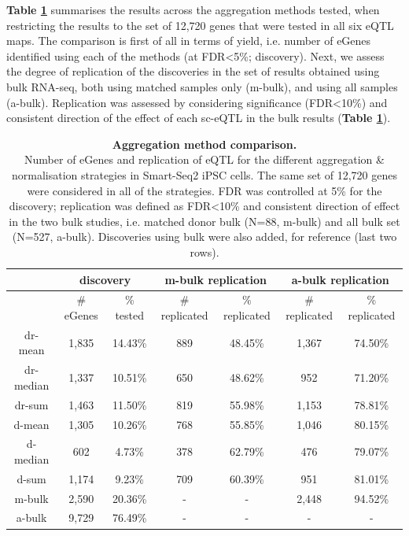 \textbf{Table \ref{tab:egenes}} summarises the results across the aggregation methods tested, when restricting the results to the set of 12,720 genes that were tested in all six eQTL maps.
The comparison is first of all in terms of yield, i.e. number of eGenes identified using each of the methods (at FDR<5\%; discovery).
Next, we assess the degree of replication of the discoveries in the set of results obtained using bulk RNA-seq, both using matched samples only (m-bulk), and using all samples (a-bulk).
Replication was assessed by considering significance (FDR<10\%) and consistent direction of the effect of each sc-eQTL in the bulk results (\textbf{Table \ref{tab:egenes}}).\\

\begin{table}[h]
    \centering
    \begin{tabular}{c|c c|c c|c c}
    & \multicolumn{2}{c}{discovery}&\multicolumn{2}{c}{m-bulk replication} &\multicolumn{2}{c}{a-bulk replication}\\
    \hline
    & \# eGenes & \% tested & \# replicated & \% replicated & \# replicated & \% replicated \\
    \hline
    dr-mean   &  1,835 & 14.43\% & 889 & 48.45\% & 1,367 & 74.50\% \\
    dr-median &  1,337 & 10.51\% & 650 & 48.62\% &   952 & 71.20\% \\
    dr-sum    &  1,463 & 11.50\% & 819 & 55.98\% & 1,153 & 78.81\% \\
    d-mean    &  1,305 & 10.26\% & 768 & 55.85\% & 1,046 & 80.15\% \\
    d-median  &    602 &  4.73\% & 378 & 62.79\% &   476 & 79.07\% \\
    d-sum     &  1,174 &  9.23\% & 709 & 60.39\% &   951 & 81.01\% \\
    \hline
    m-bulk    &  2,590 & 20.36\% & - & - & 2,448 & 94.52\% \\
    a-bulk    &  9,729 & 76.49\% & - & - & - & - \\
    \end{tabular}
    \caption[Aggregation method comparison]{\textbf{Aggregation method comparison.}\\
    Number of eGenes and replication of eQTL for the different aggregation \& normalisation strategies in Smart-Seq2 iPSC cells. 
    The same set of 12,720 genes were considered in all of the strategies.
    FDR was controlled at 5\% for the discovery; replication was defined as FDR<10\% and consistent direction of effect in the two bulk studies, i.e. matched donor bulk (N=88, m-bulk) and all bulk set (N=527, a-bulk).
    Discoveries using bulk were also added, for reference (last two rows).}
    \label{tab:egenes}
\end{table}

